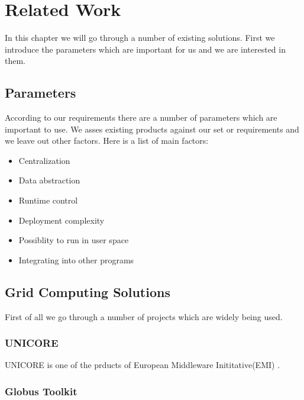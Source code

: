 \chapter{Related Work}
\label{cha:literature}

In this chapter we will go through a number of existing solutions. First we introduce the parameters which are important for us and we are interested in them.

\section{Parameters}
According to our requirements there are a number of parameters which are important to use. We asses existing products
against our set or requirements and we leave out other factors. Here is a list of main factors:

\begin{itemize}
\item Centralization
\item Data abstraction
\item Runtime control
\item Deployment complexity
\item Possiblity to run in user space
\item Integrating into other programs
\end{itemize}

\section{Grid Computing Solutions}
First of all we go through a number of projects which are widely being used.
\subsection{UNICORE}
UNICORE is one of the prducts of European Middleware Inititative(EMI) \cite{EMI}.
\subsection{Globus Toolkit}

